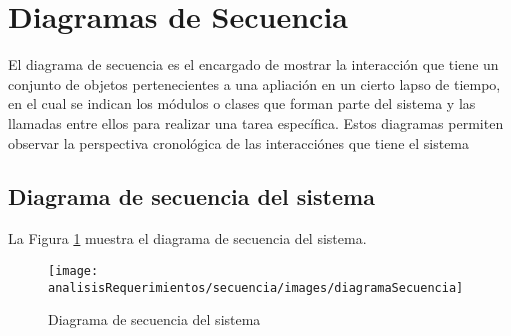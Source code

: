 \newpage
\section{Diagramas de Secuencia}
El diagrama de secuencia es el encargado de mostrar la interacción que tiene un conjunto de objetos pertenecientes a una apliación en un cierto lapso de tiempo, en el cual se indican los módulos o clases que forman parte del sistema y las llamadas entre ellos para realizar una tarea específica. Estos diagramas permiten observar la perspectiva cronológica de las interacciónes que tiene el sistema \cite{secuencia}

\subsection{Diagrama de secuencia del sistema}
La Figura \ref{fig:diagramaSecuencia} muestra el diagrama de secuencia del sistema.

\hypertarget{fig:diagramaSecuencia}{
	\begin{figure}[htbp]
		\begin{center}
			\hypertarget{fig:diagramaSecuencia}{
				\texttt{[image: analisisRequerimientos/secuencia/images/diagramaSecuencia]}
				\caption{Diagrama de secuencia del sistema}
			}
			\label{fig:diagramaSecuencia}
		\end{center}
	\end{figure}
}
